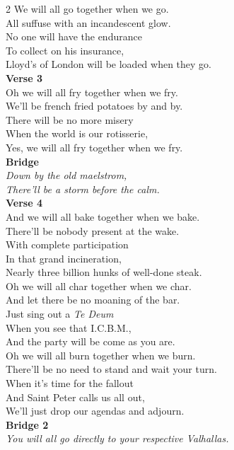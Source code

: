 \begin{commentary}
\begin{multicols}{2}
We will all go together when we go.\\
All suffuse with an incandescent glow.\\
No one will have the endurance\\
To collect on his insurance,\\
Lloyd's of London will be loaded when they go.\\[0.3em]
\noindent\textbf{Verse 3}\\[0.15em]
Oh we will all fry together when we fry.\\
We'll be french fried potatoes by and by.\\
There will be no more misery\\
When the world is our rotisserie,\\
Yes, we will all fry together when we fry.\\[0.2em]
\columnbreak
\noindent\textbf{Bridge}\\[0.15em]
\textit{Down by the old maelstrom,}\\
\textit{There'll be a storm before the calm.}\\[0.3em]
\noindent\textbf{Verse 4}\\[0.15em]
And we will all bake together when we bake.\\
There'll be nobody present at the wake.\\
With complete participation\\
In that grand incineration,\\
Nearly three billion hunks of well-done steak.\\[0.2em]
Oh we will all char together when we char.\\
And let there be no moaning of the bar.\\
Just sing out a \textit{Te Deum}\\
When you see that I.C.B.M.,\\
And the party will be \QSOpen{}come as you are.\QSClose{}\\[0.2em]
Oh we will all burn together when we burn.\\
There'll be no need to stand and wait your turn.\\
When it's time for the fallout\\
And Saint Peter calls us all out,\\
We'll just drop our agendas and adjourn.\\[0.3em]
\noindent\textbf{Bridge 2}\\[0.15em]
\textit{You will all go directly to your respective Valhallas.}\\

\end{multicols}
\end{commentary}

